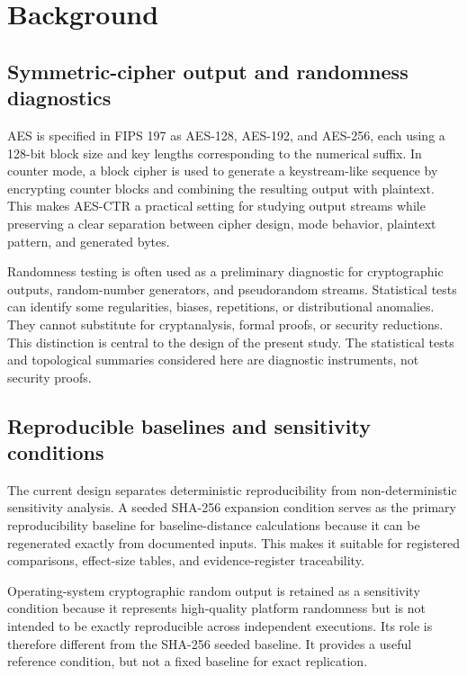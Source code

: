 
\section{Background}
\label{sec:background}

\subsection{Symmetric-cipher output and randomness diagnostics}
\label{subsec:symmetric-cipher-output}

AES is specified in FIPS 197 as AES-128, AES-192, and AES-256, each using a 128-bit block size and key lengths corresponding to the numerical suffix. In counter mode, a block cipher is used to generate a keystream-like sequence by encrypting counter blocks and combining the resulting output with plaintext. This makes AES-CTR a practical setting for studying output streams while preserving a clear separation between cipher design, mode behavior, plaintext pattern, and generated bytes.

Randomness testing is often used as a preliminary diagnostic for cryptographic outputs, random-number generators, and pseudorandom streams. Statistical tests can identify some regularities, biases, repetitions, or distributional anomalies. They cannot substitute for cryptanalysis, formal proofs, or security reductions. This distinction is central to the design of the present study. The statistical tests and topological summaries considered here are diagnostic instruments, not security proofs.

\subsection{Reproducible baselines and sensitivity conditions}
\label{subsec:reproducible-baselines}

The current design separates deterministic reproducibility from non-deterministic sensitivity analysis. A seeded SHA-256 expansion condition serves as the primary reproducibility baseline for baseline-distance calculations because it can be regenerated exactly from documented inputs. This makes it suitable for registered comparisons, effect-size tables, and evidence-register traceability.

Operating-system cryptographic random output is retained as a sensitivity condition because it represents high-quality platform randomness but is not intended to be exactly reproducible across independent executions. Its role is therefore different from the SHA-256 seeded baseline. It provides a useful reference condition, but not a fixed baseline for exact replication.

